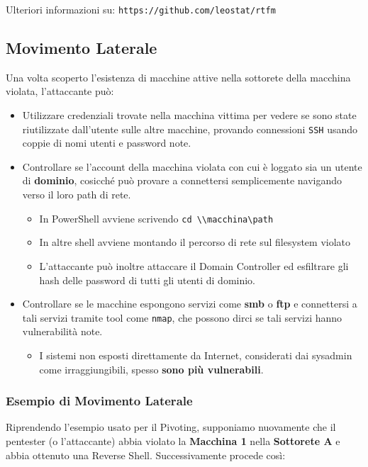 \documentclass{article}
\begin{document}
Ulteriori informazioni su: \verb|https://github.com/leostat/rtfm|

\subsection{Movimento Laterale}
Una volta scoperto l'esistenza di macchine attive nella sottorete della macchina violata, l'attaccante può:
\begin{itemize}
	\item Utilizzare credenziali trovate nella macchina vittima per vedere se sono state riutilizzate dall'utente sulle altre macchine, provando connessioni \verb|SSH| usando coppie di nomi utenti e password note.
	
	\item Controllare se l'account della macchina violata con cui è loggato sia un utente di \textbf{dominio}, cosicché può provare a connettersi semplicemente navigando verso il loro path di rete.
	\begin{itemize}
		\item In PowerShell avviene scrivendo \verb|cd \\macchina\path|
		\item In altre shell avviene montando il percorso di rete sul filesystem violato
		\item L'attaccante può inoltre attaccare il Domain Controller ed esfiltrare gli hash delle password di tutti gli utenti di dominio.
	\end{itemize}
	
	\item Controllare se le macchine espongono servizi come \textbf{smb} o \textbf{ftp} e connettersi a tali servizi tramite tool come \verb|nmap|, che possono dirci se tali servizi hanno vulnerabilità note.
	\begin{itemize}
		\item I sistemi non esposti direttamente da Internet, considerati dai sysadmin come irraggiungibili, spesso \textbf{sono più vulnerabili}.
	\end{itemize}
\end{itemize}

\subsubsection{Esempio di Movimento Laterale}
Riprendendo l'esempio usato per il Pivoting, supponiamo nuovamente che il pentester (o l'attaccante) abbia violato la \textbf{Macchina 1} nella \textbf{Sottorete A} e abbia ottenuto una Reverse Shell. Successivamente procede così:
\end{document}
